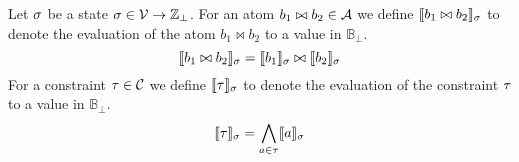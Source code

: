 \begin{definition}
  Let $\sigma$ be a state $\sigma \in \mathcal{V} \rightarrow \mathbb{Z}_\bot$.
  For an atom $b_1 \bowtie b_2 \in \mathcal{A}$ we define $\llbracket b_1 \bowtie b_2 \rrbracket_{\sigma}$ to denote the evaluation of the atom $b_1 \bowtie b_2$ to a value in $\mathbb{B}_\bot$.
  \[ \llbracket b_1 \bowtie b_2 \rrbracket_{\sigma} = \llbracket b_1 \rrbracket_{\sigma} \bowtie \llbracket b_2 \rrbracket_{\sigma} \]
  For a constraint $\tau \in \mathcal{C}$ we define $\llbracket \tau \rrbracket_{\sigma}$ to denote the evaluation of the constraint $\tau$ to a value in $\mathbb{B}_\bot$.
  \[ \llbracket \tau \rrbracket_{\sigma} = \bigwedge_{a \in \tau} \llbracket a \rrbracket_{\sigma} \]
\end{definition}
